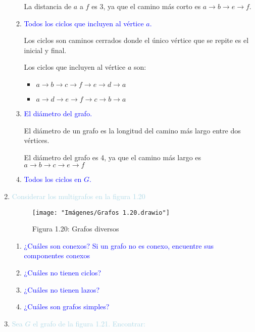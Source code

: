 \documentclass[12pt]{article}
\newcommand{\lb}[1]{\textcolor{lightblue}{#1}}
\newcommand{\db}[1]{\textcolor{blue}{#1}}
\begin{document}
\begin{enumerate}[label=\color{red}\textbf{\arabic*)},leftmargin=*]
\begin{enumerate}[label=\color{red}\alph*)]
		La distancia de $a$ a $f$ es 3, ya que el camino más corto es $a\to b\to e\to f$.
		\item \db{Todos los ciclos que incluyen al vértice $a$.}
		
		Los ciclos son caminos cerrados donde el único vértice que se repite es el inicial y final.
		
		Los ciclos que incluyen al vértice $a$ son:
		\begin{itemize}[label=$-$]
			\item $a\to b\to c\to f\to e\to d\to a$
			\item $a\to d\to e\to f\to c\to b\to a$
		\end{itemize}
		
		\item \db{El diámetro del grafo.}
		
		El diámetro de un grafo es la longitud del camino más largo entre dos vértices.
		
		El diámetro del grafo es 4, ya que el camino más largo es $a\to b\to c\to e\to f$
		\item \db{Todos los ciclos en $G$.}
		
	\end{enumerate}
	\item \lb{Considerar los multigrafos en la figura 1.20}
	
	
\begin{figure}[h]
	\centering
	\texttt{[image: "Imágenes/Grafos 1.20.drawio"]}
	\caption*{Figura 1.20: Grafos diversos}
\end{figure}
	
	\begin{enumerate}[label=\color{red}\alph*)]
		\item \db{¿Cuáles son conexos? Si un grafo no es conexo, encuentre sus componentes conexos}
		\item \db{¿Cuáles no tienen ciclos?}
		\item \db{¿Cuáles no tienen lazos?}
		\item \db{¿Cuáles son grafos simples?}
	\end{enumerate}
	
	\item \lb{Sea $G$ el grafo de la figura 1.21. Encontrar:}
	

\end{enumerate}
\end{document}
